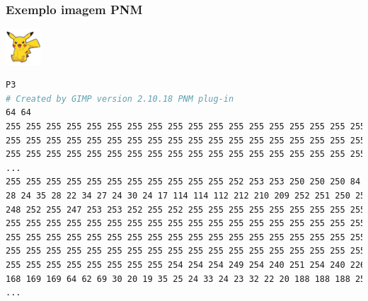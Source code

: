 \begin{frame}
\frametitle{Exemplo imagem PNM}

\includegraphics[width=0.1\textwidth,height=0.1\textheight,keepaspectratio]{figures/pikachu.png}

\begin{lstlisting}[language=bash, label=lst-pnm-ascii, caption={Arquivo PNM ASCII.}, postbreak=\mbox{$\hookrightarrow$\space}, basicstyle=\fontsize{6}{8}\selectfont\ttfamily]
P3
# Created by GIMP version 2.10.18 PNM plug-in
64 64
255 255 255 255 255 255 255 255 255 255 255 255 255 255 255 255 255 255 255 255 
255 255 255 255 255 255 255 255 255 255 255 255 255 255 255 255 255 255 255 255 
255 255 255 255 255 255 255 255 255 255 255 255 255 255 255 255 255 255 255 255 
...
255 255 255 255 255 255 255 255 255 255 255 252 253 253 250 250 250 84 82 81 33 
28 24 35 28 22 34 27 24 30 24 17 114 114 112 212 210 209 252 251 250 252 254 
248 252 255 247 253 253 252 255 252 255 255 255 255 255 255 255 255 255 255 255 
255 255 255 255 255 255 255 255 255 255 255 255 255 255 255 255 255 255 255 255 
255 255 255 255 255 255 255 255 255 255 255 255 255 255 255 255 255 255 255 255 
255 255 255 255 255 255 255 255 255 255 255 255 255 255 255 255 255 255 255 255 
255 255 255 255 255 255 255 255 254 254 254 249 254 240 251 254 240 226 224 230 
168 169 169 64 62 69 30 20 19 35 25 24 33 24 23 32 22 20 188 188 188 250 250 
...
\end{lstlisting}

\framebreak


\end{frame}
